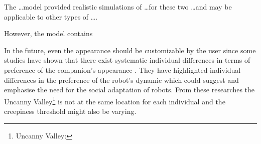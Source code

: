 \documentclass[a4paper,twocolumn]{svjour3}
\begin{document}
The \dots model provided realistic simulations of \dots for these two \dots and may be applicable to other types of \dots.



However, the model contains 



In the future, even the appearance should be customizable by the user since some studies have shown that there exist systematic individual differences in terms of preference of the companion's appearance \cite{Walters2008}. 
They have highlighted individual differences in the preference of the robot's dynamic which could suggest and emphasise the need for the social adaptation of robots. 
From these researches the Uncanny Valley\footnote{Uncanny Valley:} is not at the same location for each individual and the creepiness threshold might also be varying. 






\end{document}
